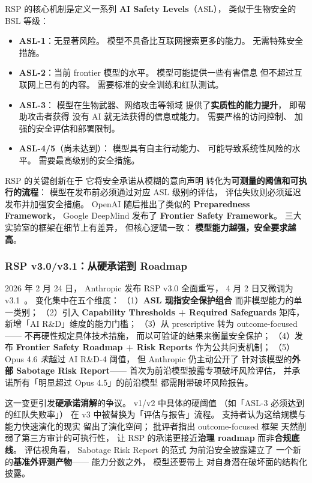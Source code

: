 RSP 的核心机制是定义一系列
\textbf{AI Safety Levels}（ASL），
类似于生物安全的 BSL 等级：
\begin{itemize}[noitemsep]
  \item \textbf{ASL-1}：无显著风险。
        模型不具备比互联网搜索更多的能力。
        无需特殊安全措施。
  \item \textbf{ASL-2}：当前 frontier 模型的水平。
        模型可能提供一些有害信息
        但不超过互联网上已有的内容。
        需要标准的安全训练和红队测试。
  \item \textbf{ASL-3}：
        模型在生物武器、网络攻击等领域
        提供了\textbf{实质性的能力提升}，
        即帮助攻击者获得
        没有 AI 就无法获得的信息或能力。
        需要严格的访问控制、
        加强的安全评估和部署限制。
  \item \textbf{ASL-4/5}（尚未达到）：
        模型具有自主行动能力、
        可能导致系统性风险的水平。
        需要最高级别的安全措施。
\end{itemize}

RSP 的关键创新在于
它将安全承诺从模糊的意向声明
转化为\textbf{可测量的阈值和可执行的流程}：
模型在发布前必须通过对应 ASL 级别的评估，
评估失败则必须延迟发布并加强安全措施。
OpenAI 随后推出了类似的
\textbf{Preparedness Framework}，
Google DeepMind 发布了
\textbf{Frontier Safety Framework}。
三大实验室的框架在细节上有差异，
但核心逻辑一致：
\textbf{模型能力越强，安全要求越高}。

\subsubsection{RSP v3.0/v3.1：从硬承诺到 Roadmap}

2026 年 2 月 24 日，
Anthropic 发布 RSP v3.0 全面重写，
4 月 2 日又微调为 v3.1~\cite{rspv31_2026}。
变化集中在五个维度：
（1）\textbf{ASL 现指安全保护组合}
而非模型能力的单一类别；
（2）引入 \textbf{Capability Thresholds + Required Safeguards} 矩阵，
新增「AI R\&D」维度的能力门槛；
（3）从 prescriptive 转为 outcome-focused——
不再硬性规定具体技术措施，
而以可验证的结果来衡量安全保护；
（4）发布 \textbf{Frontier Safety Roadmap + Risk Reports}
作为公共问责机制；
（5）Opus 4.6 \emph{未}越过 AI R\&D-4 阈值，
但 Anthropic 仍主动公开了
针对该模型的\textbf{外部 Sabotage Risk Report}——
首次为前沿模型披露专项破坏风险评估，
并承诺所有「明显超过 Opus 4.5」的前沿模型
都需附带破坏风险报告。

这一变更引发\textbf{硬承诺消解}的争议。
v1/v2 中具体的硬阈值
（如「ASL-3 必须达到的红队失败率」）
在 v3 中被替换为「评估与报告」流程。
支持者认为这给规模与能力快速演化的现实
留出了演化空间；
批评者指出 outcome-focused 框架
天然削弱了第三方审计的可执行性，
让 RSP 的承诺更接近\textbf{治理 roadmap}
而非\textbf{合规底线}。
评估视角看，
Sabotage Risk Report 的范式
为前沿安全披露建立了
一个新的\textbf{基准外评测产物}——
能力分数之外，
模型还要带上
对自身潜在破坏面的结构化披露。

